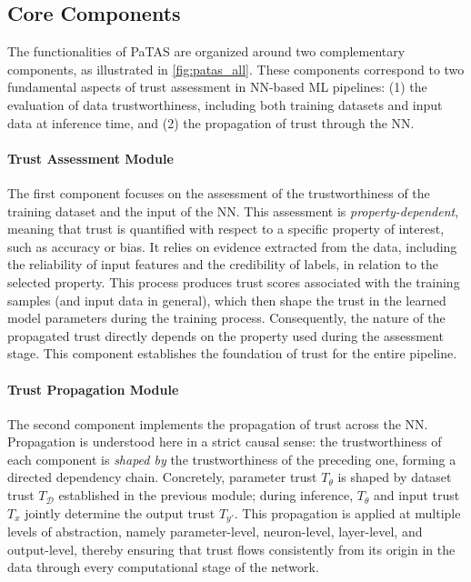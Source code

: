 \subsection{Core Components}

The functionalities of \ac{PaTAS} are organized around two complementary components, as illustrated in \cref{fig:patas_all}. These components correspond to two fundamental aspects of trust assessment in \ac{NN}-based \ac{ML} pipelines: (1) the evaluation of data trustworthiness, including both training datasets and input data at inference time, and (2) the propagation of trust through the \ac{NN}.

\paragraph{Trust Assessment Module} The first component focuses on the assessment of the trustworthiness of the training dataset and the input of the \ac{NN}. This assessment is \emph{property-dependent}, meaning that trust is quantified with respect to a specific property of interest, such as accuracy or bias. It relies on evidence extracted from the data, including the reliability of input features and the credibility of labels, in relation to the selected property. This process produces trust scores associated with the training samples (and input data in general), which then shape the trust in the learned model parameters during the training process. Consequently, the nature of the propagated trust directly depends on the property used during the assessment stage. This component establishes the foundation of trust for the entire pipeline.

\paragraph{Trust Propagation Module}
The second component implements the propagation of trust across the \ac{NN}. Propagation is understood here in a strict causal sense: the trustworthiness of each component is \emph{shaped by} the trustworthiness of the preceding one, forming a directed dependency chain. Concretely, parameter trust $T_\theta$ is shaped by dataset trust $T_{\mathcal{D}}$ established in the previous module; during inference, $T_\theta$ and input trust $T_x$ jointly determine the output trust $T_{y'}$. This propagation is applied at multiple levels of abstraction, namely parameter-level, neuron-level, layer-level, and output-level, thereby ensuring that trust flows consistently from its origin in the data through every computational stage of the network.

